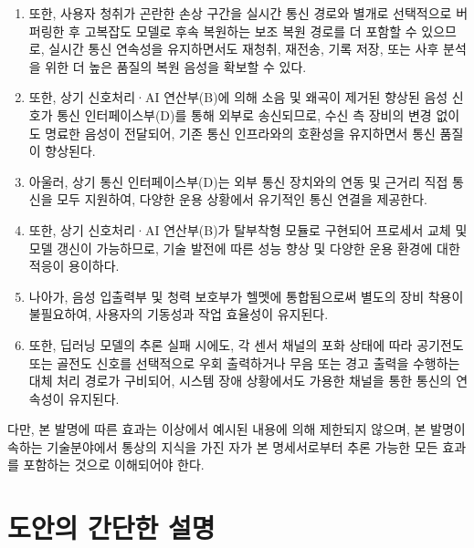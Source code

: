 \documentclass{article}
\DeclareRobustCommand{\codexedit}[1]{\textcolor{customorange}{#1}}
\begin{document}
\begin{enumerate}[label = \textbf{(\arabic*)}]
    \item \codexedit{또한, 사용자 청취가 곤란한 손상 구간을 실시간 통신 경로와 별개로 선택적으로 버퍼링한 후 고복잡도 모델로 후속 복원하는 보조 복원 경로를 더 포함할 수 있으므로, 실시간 통신 연속성을 유지하면서도 재청취, 재전송, 기록 저장, 또는 사후 분석을 위한 더 높은 품질의 복원 음성을 확보할 수 있다.}

    \item 또한, 상기 신호처리·AI 연산부(B)에 의해 소음 및 왜곡이 제거된 향상된 음성 신호가 통신 인터페이스부(D)를 통해 외부로 송신되므로, 수신 측 장비의 변경 없이도 명료한 음성이 전달되어, 기존 통신 인프라와의 호환성을 유지하면서 통신 품질이 향상된다.
    
    \item 아울러, 상기 통신 인터페이스부(D)는 외부 통신 장치와의 연동 및 근거리 직접 통신을 모두 지원하여, 다양한 운용 상황에서 유기적인 통신 연결을 제공한다.

    \item 또한, 상기 신호처리·AI 연산부(B)가 탈부착형 모듈로 구현되어 프로세서 교체 및 모델 갱신이 가능하므로, 기술 발전에 따른 성능 향상 및 다양한 운용 환경에 대한 적응이 용이하다. 
    
    \item 나아가, 음성 입출력부 및 청력 보호부가 헬멧에 통합됨으로써 별도의 장비 착용이 불필요하여, 사용자의 기동성과 작업 효율성이 유지된다.

    \item \codexedit{또한, 딥러닝 모델의 추론 실패 시에도, 각 센서 채널의 포화 상태에 따라 공기전도 또는 골전도 신호를 선택적으로 우회 출력하거나 무음 또는 경고 출력을 수행하는 대체 처리 경로가 구비되어, 시스템 장애 상황에서도 가용한 채널을 통한 통신의 연속성이 유지된다.}

\end{enumerate}

다만, 본 발명에 따른 효과는 이상에서 예시된 내용에 의해 제한되지 않으며, 본 발명이 속하는 기술분야에서 통상의 지식을 가진 자가 본 명세서로부터 추론 가능한 모든 효과를 포함하는 것으로 이해되어야 한다.





\section{도안의 간단한 설명}
\end{document}
